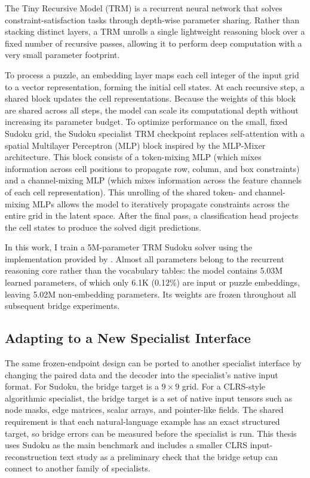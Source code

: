 \documentclass[11pt]{article}
\begin{document}
The Tiny Recursive Model (TRM) \cite{jolicoeur-martineauLessMoreRecursive2025} is a recurrent neural network that solves constraint-satisfaction tasks through depth-wise parameter sharing.
Rather than stacking distinct layers, a TRM unrolls a single lightweight reasoning block over a fixed number of recursive passes, allowing it to perform deep computation with a very small parameter footprint.

To process a puzzle, an embedding layer maps each cell integer of the input grid to a vector representation, forming the initial cell states.
At each recursive step, a shared block updates the cell representations.
Because the weights of this block are shared across all steps, the model can scale its computational depth without increasing its parameter budget.
To optimize performance on the small, fixed Sudoku grid, the Sudoku specialist TRM checkpoint replaces self-attention with a spatial Multilayer Perceptron (MLP) block inspired by the MLP-Mixer architecture.
This block consists of a token-mixing MLP (which mixes information across cell positions to propagate row, column, and box constraints) and a channel-mixing MLP (which mixes information across the feature channels of each cell representation).
This unrolling of the shared token- and channel-mixing MLPs allows the model to iteratively propagate constraints across the entire grid in the latent space.
After the final pass, a classification head projects the cell states to produce the solved digit predictions.

In this work, I train a 5M-parameter TRM Sudoku solver using the implementation provided by \citet{jolicoeur-martineauLessMoreRecursive2025}.
Almost all parameters belong to the recurrent reasoning core rather than the vocabulary tables: the model contains 5.03M learned parameters, of which only 6.1K (0.12\%) are input or puzzle embeddings, leaving 5.02M non-embedding parameters.
Its weights are frozen throughout all subsequent bridge experiments.


\subsection{Adapting to a New Specialist Interface}
\label{sec:domain_adaptation}

The same frozen-endpoint design can be ported to another specialist interface by changing the paired data and the decoder into the specialist's native input format.
For Sudoku, the bridge target is a $9{\times}9$ grid.
For a CLRS-style algorithmic specialist, the bridge target is a set of native input tensors such as node masks, edge matrices, scalar arrays, and pointer-like fields.
The shared requirement is that each natural-language example has an exact structured target, so bridge errors can be measured before the specialist is run.
This thesis uses Sudoku as the main benchmark and includes a smaller CLRS input-reconstruction text study as a preliminary check that the bridge setup can connect to another family of specialists.
\end{document}
